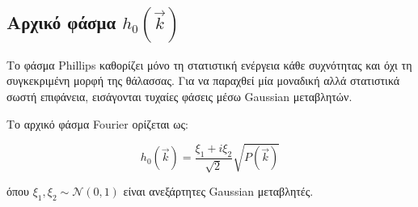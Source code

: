 \subsection{\texorpdfstring{Αρχικό φάσμα
\(h_0(\vec{k})\)}{Αρχικό φάσμα h\_0(\textbackslash vec\{k\})}}\label{ux3b1ux3c1ux3c7ux3b9ux3baux3cc-ux3c6ux3acux3c3ux3bcux3b1-h_0veck}

Το φάσμα Phillips καθορίζει μόνο τη στατιστική ενέργεια κάθε συχνότητας
και όχι τη συγκεκριμένη μορφή της θάλασσας. Για να παραχθεί μία μοναδική
αλλά στατιστικά σωστή επιφάνεια, εισάγονται τυχαίες φάσεις μέσω Gaussian
μεταβλητών.

Το αρχικό φάσμα Fourier ορίζεται ως:

\[
h_0(\vec{k})
=
\frac{\xi_1 + i\xi_2}{\sqrt{2}}
\sqrt{P(\vec{k})}
\]

όπου \(\xi_1,\xi_2 \sim \mathcal N(0,1)\) είναι ανεξάρτητες Gaussian
μεταβλητές.

